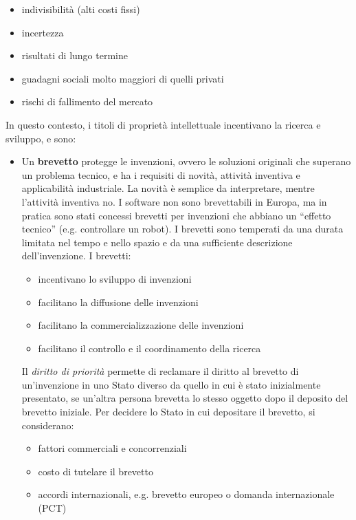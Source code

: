 \documentclass[answers, a4paper, 11pt]{exam}
\begin{document}
\begin{itemize}
    \item indivisibilità (alti costi fissi)
    \item incertezza
    \item risultati di lungo termine
    \item guadagni sociali molto maggiori di quelli privati
    \item rischi di fallimento del mercato
\end{itemize}

In questo contesto, i titoli di proprietà intellettuale incentivano la ricerca e sviluppo, e sono:

\begin{itemize}
    \item Un \textbf{brevetto} protegge le invenzioni, ovvero le soluzioni originali che superano un problema tecnico, e ha i requisiti di novità, attività inventiva e applicabilità industriale. La novità è semplice da interpretare, mentre l'attività inventiva no. I software non sono brevettabili in Europa, ma in pratica sono stati concessi brevetti per invenzioni che abbiano un ``effetto tecnico'' (e.g. controllare un robot). I brevetti sono temperati da una durata limitata nel tempo e nello spazio e da una sufficiente descrizione dell'invenzione. 
    I brevetti:
    \begin{itemize}
        \item incentivano lo sviluppo di invenzioni
        \item facilitano la diffusione delle invenzioni
        \item facilitano la commercializzazione delle invenzioni
        \item facilitano il controllo e il coordinamento della ricerca
    \end{itemize}
    Il \emph{diritto di priorità} permette di reclamare il diritto al brevetto di un'invenzione in uno Stato diverso da quello in cui è stato inizialmente presentato, se un'altra persona brevetta lo stesso oggetto dopo il deposito del brevetto iniziale. Per decidere lo Stato in cui depositare il brevetto, si considerano:
    \begin{itemize}
        \item fattori commerciali e concorrenziali
        \item costo di tutelare il brevetto
        \item accordi internazionali, e.g. brevetto europeo o domanda internazionale (PCT)
    \end{itemize}

\end{itemize}
\end{document}
